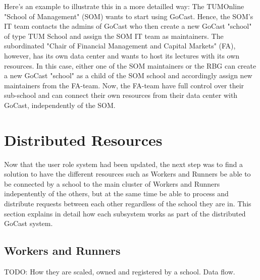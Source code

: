 Here's an example to illustrate this in a more detailled way:
The TUMOnline "School of Management" (SOM) wants to start using GoCast. Hence, the SOM's IT team contacts the admins of GoCast who then create a new GoCast "school" of type TUM School and assign the SOM IT team as maintainers.
The subordinated "Chair of Financial Management and Capital Markets" (FA), however, has its own data center and wants to host its lectures with its own resources. In this case, either one of the SOM maintainers or the RBG can create a new GoCast "school" as a child of the SOM school and accordingly assign new maintainers from the FA-team. Now, the FA-team have full control over their sub-school and can connect their own resources from their data center with GoCast, independently of the SOM.











\section{Distributed Resources}

Now that the user role system had been updated, the next step was to find a solution to have the different resources such as Workers and Runners be able to be connected by a school to the main cluster of Workers and Runners indepentently of the others, but at the same time be able to process and distribute requests between each other regardless of the school they are in. This section explains in detail how each subsystem works as part of the distributed GoCast system. 

\subsection{Workers and Runners}
TODO: How they are scaled, owned and registered by a school. Data flow. 

